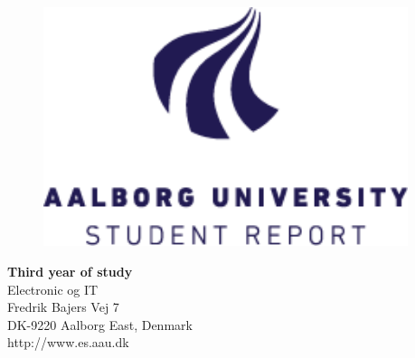 {}
\thispagestyle{empty}

\begin{minipage}[t]{0.48\textwidth}
\vspace*{-25pt}			%

\begin{figure}[H] 
\includegraphics[width=0.95\textwidth]{rapport/introduktion/aau_logo1}
\end{figure} 
\end{minipage}
\hfill
\begin{minipage}[t]{0.48\textwidth}
{\small 
\textbf{Third year of study}  \\
Electronic og IT \\
Fredrik Bajers Vej 7 \\
DK-9220 Aalborg East, Denmark\\
http://www.es.aau.dk}
\end{minipage}


\vspace*{1cm}

